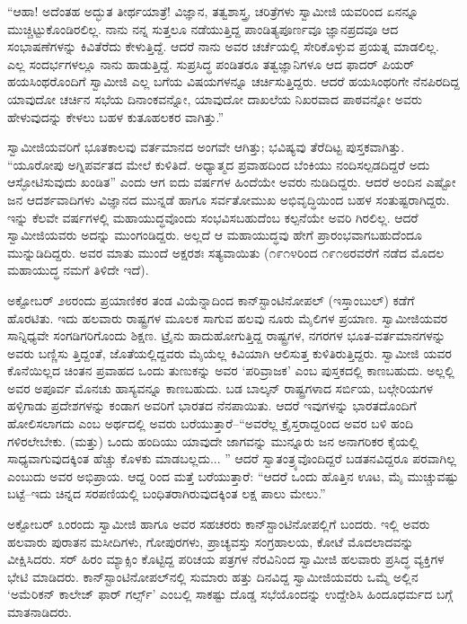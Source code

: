 “ಆಹಾ! ಅದೆಂತಹ ಅದ್ಭುತ ತೀರ್ಥಯಾತ್ರೆ! ವಿಜ್ಞಾನ, ತತ್ವಶಾಸ್ತ್ರ, ಚರಿತ್ರೆಗಳು ಸ್ವಾಮೀಜಿ ಯವರಿಂದ ಏನನ್ನೂ ಮುಚ್ಚಿಟ್ಟುಕೊಂಡಿರಲಿಲ್ಲ. ನಾನು ನನ್ನ ಸುತ್ತಲೂ ನಡೆಯುತ್ತಿದ್ದ ಪಾಂಡಿತ್ಯಪೂರ್ಣವೂ ಜ್ಞಾನಪ್ರದವೂ ಆದ ಸಂಭಾಷಣೆಗಳನ್ನು ಕಿವಿತೆರೆದು ಕೇಳುತ್ತಿದ್ದೆ. ಆದರೆ ನಾನು ಅವರ ಚರ್ಚೆಯಲ್ಲಿ ಸೇರಿಕೊಳ್ಳುವ ಪ್ರಯತ್ನ ಮಾಡಲಿಲ್ಲ. ಎಲ್ಲ ಸಂದರ್ಭಗಳಲ್ಲೂ ನಾನು ಹಾಡುತ್ತಿದ್ದೆ. ಸುಪ್ರಸಿದ್ಧ ಪಂಡಿತರೂ ತತ್ವಜ್ಞಾನಿಗಳೂ ಆದ ಫಾದರ್ ಪಿಯರ್ ಹಯಸಿಂಥರೊಂದಿಗೆ ಸ್ವಾಮೀಜಿ ಎಲ್ಲ ಬಗೆಯ ವಿಷಯಗಳನ್ನೂ ಚರ್ಚಿಸುತ್ತಿದ್ದರು. ಆದರೆ ಹಯಸಿಂಥರಿಗೇ ನೆನಪಿರದಿದ್ದ ಯಾವುದೋ ಚರ್ಚಿನ ಸಭೆಯ ದಿನಾಂಕವನ್ನೋ, ಯಾವುದೋ ದಾಖಲೆಯ ನಿಖರವಾದ ಪಾಠವನ್ನೋ ಅವರು ಹೇಳುವುದನ್ನು ಕೇಳಲು ಬಹಳ ಕುತೂಹಲಕರ ವಾಗಿತ್ತು.”

ಸ್ವಾಮೀಜಿಯವರಿಗೆ ಭೂತಕಾಲವು ವರ್ತಮಾನದ ಅಂಗವೇ ಆಗಿತ್ತು; ಭವಿಷ್ಯವು ತೆರೆದಿಟ್ಟ ಪುಸ್ತಕವಾಗಿತ್ತು. “ಯೂರೋಪು ಅಗ್ನಿಪರ್ವತದ ಮೇಲೆ ಕುಳಿತಿದೆ. ಅಧ್ಯಾತ್ಮದ ಪ್ರವಾಹದಿಂದ ಬೆಂಕಿಯು ನಂದಿಸಲ್ಪಡದಿದ್ದರೆ ಅದು ಆಸ್ಫೋಟಿಸುವುದು ಖಂಡಿತ” ಎಂದು ಆಗ ಐದು ವರ್ಷಗಳ ಹಿಂದೆಯೇ ಅವರು ನುಡಿದಿದ್ದರು. ಆದರೆ ಅಂದಿನ ಎಷ್ಟೋ ಜನ ಆದರ್ಶವಾದಿಗಳು ವಿಜ್ಞಾನದ ಮುನ್ನಡೆ ಹಾಗೂ ಸರ್ವತೋಮುಖ ಅಭಿವೃದ್ಧಿಯಿಂದ ಬಹಳ ಸಂತುಷ್ಟರಾಗಿದ್ದರು. ಇನ್ನು ಕೆಲವೇ ವರ್ಷಗಳಲ್ಲಿ ಮಹಾಯುದ್ಧವೊಂದು ಸಂಭವಿಸಬಹುದೆಂಬ ಕಲ್ಪನೆಯೇ ಅವರಿ ಗಿರಲಿಲ್ಲ. ಆದರೆ ಸ್ವಾಮೀಜಿಯವರು ಅದನ್ನು ಮುಂಗಂಡಿದ್ದರು. ಅಲ್ಲದೆ ಆ ಮಹಾಯುದ್ಧವು ಹೇಗೆ ಪ್ರಾರಂಭವಾಗಬಹುದೆಂದೂ ಮುನ್ನುಡಿದಿದ್ದರು. ಅವರ ಮಾತು ಮುಂದೆ ಅಕ್ಷರಶಃ ಸತ್ಯವಾಯಿತು (೧೯೧೪ರಿಂದ ೧೯೧೮ರವರೆಗೆ ನಡೆದ ಮೊದಲ ಮಹಾಯುದ್ಧ ನಮಗೆ ತಿಳಿದೇ ಇದೆ).

ಅಕ್ಟೋಬರ್ ೨೮ರಂದು ಪ್ರಯಾಣಿಕರ ತಂಡ ವಿಯೆನ್ನಾದಿಂದ ಕಾನ್​ಸ್ಟಾಂಟಿನೋಪಲ್ (ಇಸ್ತಾಂಬುಲ್​) ಕಡೆಗೆ ಹೊರಟಿತು. ಇದು ಹಲವಾರು ರಾಷ್ಟ್ರಗಳ ಮೂಲಕ ಸಾಗುವ ಹಲವು ನೂರು ಮೈಲಿಗಳ ಪ್ರಯಾಣ. ಸ್ವಾಮೀಜಿಯವರ ಸಾನ್ನಿಧ್ಯವೇ ಸಂಗಡಿಗರಿಗೊಂದು ಶಿಕ್ಷಣ. ಟ್ರೈನು ಹಾದುಹೋಗುತ್ತಿದ್ದ ರಾಷ್ಟ್ರಗಳ, ನಗರಗಳ ಭೂತ-ವರ್ತಮಾನಗಳನ್ನು ಅವರು ಬಣ್ಣಿಸು ತ್ತಿದ್ದಂತೆ, ಜೊತೆಯಲ್ಲಿದ್ದವರು ಮೈಯೆಲ್ಲ ಕಿವಿಯಾಗಿ ಆಲಿಸುತ್ತ ಕುಳಿತಿರುತ್ತಿದ್ದರು. ಸ್ವಾಮೀಜಿ ಯವರ ಕೊನೆಯಿಲ್ಲದ ಚಿಂತನ ಪ್ರವಾಹದ ಒಂದು ತುಣುಕನ್ನು ಅವರ ‘ಪರಿವ್ರಾಜಕ’ ಎಂಬ ಪುಸ್ತಕದಲ್ಲಿ ಕಾಣಬಹುದು. ಅಲ್ಲಲ್ಲಿ ಅವರ ಅಪೂರ್ವ ಮೊನಚು ಹಾಸ್ಯವನ್ನೂ ಕಾಣಬಹುದು. ಬಡ ಬಾಲ್ಕನ್ ರಾಷ್ಟ್ರಗಳಾದ ಸರ್ಬಿಯ, ಬಲ್ಗೇರಿಯಗಳ ಹಳ್ಳಿಗಾಡು ಪ್ರದೇಶಗಳನ್ನು ಕಂಡಾಗ ಅವರಿಗೆ ಭಾರತದ ನೆನಪಾಯಿತು. ಆದರೆ ಇವುಗಳನ್ನು ಭಾರತದೊಂದಿಗೆ ಹೋಲಿಸಲಾಗದು ಎಂಬ ಅರ್ಥದಲ್ಲಿ ಅವರು ಬರೆಯುತ್ತಾರೆ–“ಅವರೆಲ್ಲ ಕ್ರೈಸ್ತರಾದ್ದರಿಂದ ಅವರ ಬಳಿ ಹಂದಿ ಗಳಿರಲೇಬೇಕು. (ಮತ್ತು) ಒಂದು ಹಂದಿಯು ಯಾವುದೇ ಜಾಗವನ್ನು ಮುನ್ನೂರು ಜನ ಅನಾಗರಿಕರ ಕೈಯಲ್ಲಿ ಸಾಧ್ಯವಾಗುವುದಕ್ಕಿಂತ ಹೆಚ್ಚು ಕೊಳಕು ಮಾಡಬಲ್ಲದು... ” ಆದರೆ ಸ್ವಾತಂತ್ರ್ಯವೊಂದಿದ್ದರೆ ಬಡತನವಿದ್ದರೂ ಪರವಾಗಿಲ್ಲ ಎಂಬುದು ಅವರ ಅಭಿಪ್ರಾಯ. ಆದ್ದ ರಿಂದ ಮತ್ತೆ ಬರೆಯುತ್ತಾರೆ: “ಆದರೆ ಒಂದು ಹೊತ್ತಿನ ಊಟ, ಮೈ ಮುಚ್ಚುವಷ್ಟು ಬಟ್ಟೆ–ಇದು ಚಿನ್ನದ ಸರಪಣಿಯಲ್ಲಿ ಬಂಧಿತರಾಗಿರುವುದಕ್ಕಿಂತ ಲಕ್ಷ ಪಾಲು ಮೇಲು.”

ಅಕ್ಟೋಬರ್ ೩ಂರಂದು ಸ್ವಾಮೀಜಿ ಹಾಗೂ ಅವರ ಸಹಚರರು ಕಾನ್​ಸ್ಟಾಂಟಿನೋಪಲ್ಲಿಗೆ ಬಂದರು. ಇಲ್ಲಿ ಅವರು ಹಲವಾರು ಪುರಾತನ ಮಸೀದಿಗಳು, ಗೋಪುರಗಳು, ಪ್ರಾಚ್ಯವಸ್ತು ಸಂಗ್ರಹಾಲಯ, ಕೋಟೆ ಮೊದಲಾದವನ್ನು ವೀಕ್ಷಿಸಿದರು. ಸರ್ ಹಿರಂ ಮ್ಯಾಕ್ಸಿಂ ಕೊಟ್ಟಿದ್ದ ಪರಿಚಯ ಪತ್ರಗಳ ನೆರವಿನಿಂದ ಸ್ವಾಮೀಜಿ ಹಲವಾರು ಪ್ರಸಿದ್ಧ ವ್ಯಕ್ತಿಗಳ ಭೇಟಿ ಮಾಡಿದರು. ಕಾನ್​ಸ್ಟಾಂಟಿನೋಪಲ್​ನಲ್ಲಿ ಸುಮಾರು ಹತ್ತು ದಿನವಿದ್ದ ಸ್ವಾಮೀಜಿಯವರು ಒಮ್ಮೆ ಅಲ್ಲಿನ ‘ಅಮೆರಿಕನ್ ಕಾಲೇಜ್ ಫಾರ್ ಗರ್ಲ್ಸ್​’ ಎಂಬಲ್ಲಿ ಸಾಕಷ್ಟು ದೊಡ್ಡ ಸಭೆಯೊಂದನ್ನು ಉದ್ದೇಶಿಸಿ ಹಿಂದೂಧರ್ಮದ ಬಗ್ಗೆ ಮಾತನಾಡಿದರು.

